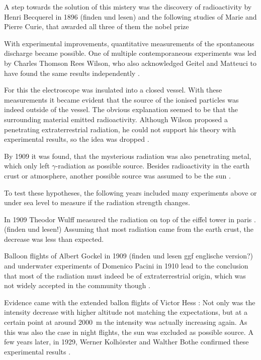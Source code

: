 A step towards the solution of this mistery was the discovery 
of radioactivity by Henri Becquerel in 1896 
\cite{becquerel1896emission} (finden und lesen)
and the following studies of Marie and Pierre Curie, 
that awarded all three of them the nobel prize \cite{nobel_curie}

With experimental improvements, quantitative measurements
of the spontaneous discharge became possible.
One of multiple contemporaneous experiments was 
led by Charles Thomson Rees Wilson, who also 
acknowledged Geitel and Matteuci to have found the same 
results independently
\cite{doi:10.1098/rspl.1901.0032}.

For this the electroscope was insulated into a closed vessel.
With these measurements it became evident that the source 
of the ionised particles was indeed outside of the vessel.
The obvious explanation seemed to be that the surrounding material 
emitted radioactivity.
Although Wilson proposed a penetrating extraterrestrial radiation, 
he could not support his theory with experimental results, 
so the idea was dropped \cite{bookap}.

By 1909 it was found, that the mysterious radiation was also 
penetrating metal, which only left $\gamma$-radiation as 
possible source. Besides radioactivity in the earth crust or atmosphere,
another possible source was assumed to be the sun \cite{bookap}.

To test these hypotheses, the following years included many experiments 
above or under sea level to measure if the radiation strength changes.

In 1909 Theodor Wulff measured the radiation on top of the 
eiffel tower in paris
\cite{wulf1909atmosphare}. (finden und lesen!)
Assuming that most radiation came from the 
earth crust, the decrease was less than expected.

Balloon flights of Albert Gockel in 1909 
\cite{gockel1909atmosphare} (finden und lesen ggf englische version?)
and underwater experiments of Domenico Pacini in 1910 
\cite{2011arXiv1101.3015P}
lead to the conclusion that most of the radiation must indeed be
of extraterrestrial origin, which was not widely accepted 
in the community though \cite{bookap}.

Evidence came with the extended ballon flights of Victor Hess
\cite{Hess:1912srp}:
Not only was the intensity decrease with higher altitude not 
matching the expectations, but at a certain point at around 
\SI{2000}{\meter} the intensity 
was actually increasing again.
As this was also the case in night flights, the sun
was excluded as possible source.
A few years later, in 1929, Werner Kolhörster and 
Walther Bothe confirmed these experimental results \cite{bothe1929wesen}.

